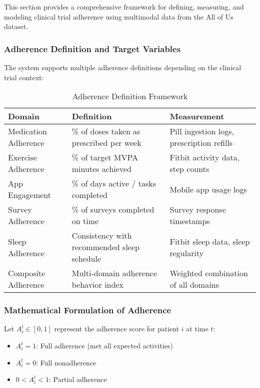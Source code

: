 \documentclass[12pt]{article}
\begin{document}
This section provides a comprehensive framework for defining, measuring, and modeling clinical trial adherence using multimodal data from the All of Us dataset.

\subsubsection{Adherence Definition and Target Variables}

The system supports multiple adherence definitions depending on the clinical trial context:

\begin{table}[h]
\centering
\begin{tabular}{|l|l|l|}
\hline
\textbf{Domain} & \textbf{Definition} & \textbf{Measurement} \\
\hline
Medication Adherence & \% of doses taken as prescribed per week & Pill ingestion logs, prescription refills \\
Exercise Adherence & \% of target MVPA minutes achieved & Fitbit activity data, step counts \\
App Engagement & \% of days active / tasks completed & Mobile app usage logs \\
Survey Adherence & \% of surveys completed on time & Survey response timestamps \\
Sleep Adherence & Consistency with recommended sleep schedule & Fitbit sleep data, sleep regularity \\
Composite Adherence & Multi-domain adherence behavior index & Weighted combination of all domains \\
\hline
\end{tabular}
\caption{Adherence Definition Framework}
\end{table}

\subsubsection{Mathematical Formulation of Adherence}

Let $A_i^t \in [0,1]$ represent the adherence score for patient $i$ at time $t$:

\begin{itemize}
    \item $A_i^t = 1$: Full adherence (met all expected activities)
    \item $A_i^t = 0$: Full nonadherence
    \item $0 < A_i^t < 1$: Partial adherence
\end{itemize}
\end{document}
